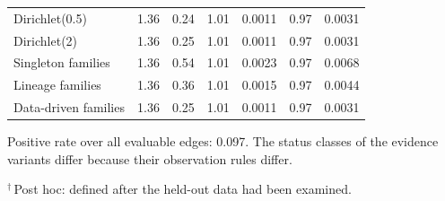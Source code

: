 \begin{table}[htbp]
\begin{tabular}{@{}lcccccc@{}}
Dirichlet(0.5) & 1.36 & 0.24 & 1.01 & 0.0011 & 0.97 & 0.0031 \\
Dirichlet(2) & 1.36 & 0.25 & 1.01 & 0.0011 & 0.97 & 0.0031 \\
Singleton families & 1.36 & 0.54 & 1.01 & 0.0023 & 0.97 & 0.0068 \\
Lineage families & 1.36 & 0.36 & 1.01 & 0.0015 & 0.97 & 0.0044 \\
Data-driven families & 1.36 & 0.25 & 1.01 & 0.0011 & 0.97 & 0.0031 \\
\bottomrule
\end{tabular}
\par\smallskip
\begin{minipage}{\linewidth}\footnotesize
Positive rate over all evaluable edges: 0.097. The status classes of the evidence variants differ because their observation rules differ.

$^{\dagger}$\,Post hoc: defined after the held-out data had been examined.
\end{minipage}
\end{table}
